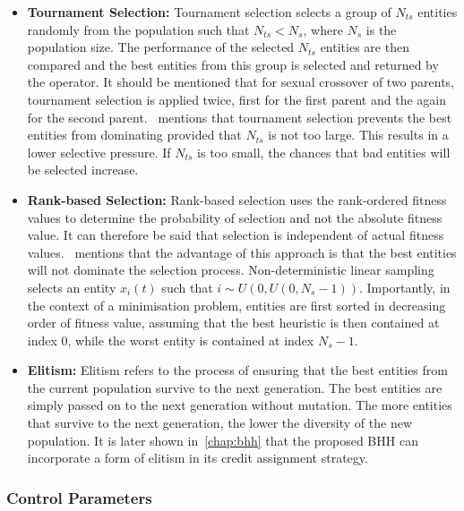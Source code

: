 \begin{itemize}
      \item \textbf{Tournament Selection: } Tournament selection selects a group of $N_{ts}$ entities randomly from the population such that $N_{ts} < N_{s}$, where $N_{s}$ is the population size. The performance of the selected $N_{ts}$ entities are then compared and the best entities from this group is selected and returned by the operator. It should be mentioned that for sexual crossover of two parents, tournament selection is applied twice, first for the first parent and the again for the second parent.~\citeauthor{ref:engelbrecht:2007}\cite{ref:engelbrecht:2007} mentions that tournament selection prevents the best entities from dominating provided that $N_{ts}$ is not too large. This results in a lower selective pressure. If $N_{ts}$ is too small, the chances that bad entities will be selected increase.

      \item \textbf{Rank-based Selection: } Rank-based selection uses the rank-ordered fitness values to determine the probability of selection and not the absolute fitness value. It can therefore be said that selection is independent of actual fitness values.~\citeauthor{ref:engelbrecht:2007}\cite{ref:engelbrecht:2007} mentions that the advantage of this approach is that the best entities will not dominate the selection process. Non-deterministic linear sampling selects an entity $x_{i}(t)$ such that $i \sim U(0, U(0, N_{s} - 1))$. Importantly, in the context of a minimisation problem, entities are first sorted in decreasing order of fitness value, assuming that the best heuristic is then contained at index 0, while the worst entity is contained at index $N_{s} - 1$.

      \item \textbf{Elitism: } Elitism refers to the process of ensuring that the best entities from the current population survive to the next generation. The best entities are simply passed on to the next generation without mutation. The more entities that survive to the next generation, the lower the diversity of the new population. It is later shown in~\ref{chap:bhh} that the proposed \ac{BHH} can incorporate a form of elitism in its credit assignment strategy.
\end{itemize}


\subsubsection{Control Parameters}
\label{sec:heuristics:mh:ga:control_parameters}

